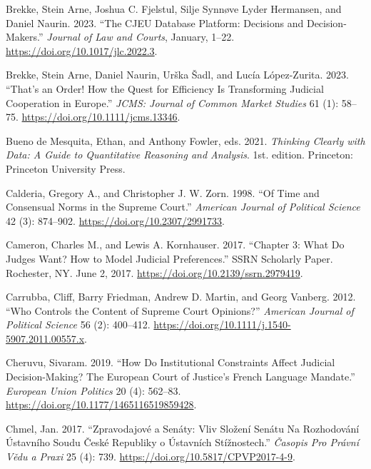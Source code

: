 \documentclass[
  11pt,
]{article}
\newlength{\cslhangindent}
\newenvironment{CSLReferences}[2] %
 {%
  \setlength{\parindent}{0pt}
  \ifodd #1 \everypar{\setlength{\hangindent}{\cslhangindent}}\ignorespaces\fi
  \ifnum #2 > 0
  \setlength{\parskip}{#2\baselineskip}
  \fi
 }%
 {}
\begin{document}
\begin{CSLReferences}{1}{0}
\leavevmode{}%
Brekke, Stein Arne, Joshua C. Fjelstul, Silje Synnøve Lyder Hermansen,
and Daniel Naurin. 2023. {``The {CJEU Database Platform}: {Decisions}
and {Decision-Makers}.''} \emph{Journal of Law and Courts}, January,
1--22. \url{https://doi.org/10.1017/jlc.2022.3}.

\leavevmode{}%
Brekke, Stein Arne, Daniel Naurin, Urška Šadl, and Lucía López-Zurita.
2023. {``That's an {Order}! {How} the {Quest} for {Efficiency Is
Transforming Judicial Cooperation} in {Europe}.''} \emph{JCMS: Journal
of Common Market Studies} 61 (1): 58--75.
\url{https://doi.org/10.1111/jcms.13346}.

\leavevmode{}%
Bueno de Mesquita, Ethan, and Anthony Fowler, eds. 2021. \emph{Thinking
Clearly with Data: A Guide to Quantitative Reasoning and Analysis}. 1st.
edition. {Princeton}: {Princeton University Press}.

\leavevmode{}%
Calderia, Gregory A., and Christopher J. W. Zorn. 1998. {``Of {Time} and
{Consensual Norms} in the {Supreme Court}.''} \emph{American Journal of
Political Science} 42 (3): 874--902.
\url{https://doi.org/10.2307/2991733}.

\leavevmode{}%
Cameron, Charles M., and Lewis A. Kornhauser. 2017. {``Chapter 3: {What
Do Judges Want}? {How} to {Model Judicial Preferences}.''} SSRN
Scholarly Paper. {Rochester, NY}. June 2, 2017.
\url{https://doi.org/10.2139/ssrn.2979419}.

\leavevmode{}%
Carrubba, Cliff, Barry Friedman, Andrew D. Martin, and Georg Vanberg.
2012. {``Who {Controls} the {Content} of {Supreme Court Opinions}?''}
\emph{American Journal of Political Science} 56 (2): 400--412.
\url{https://doi.org/10.1111/j.1540-5907.2011.00557.x}.

\leavevmode{}%
Cheruvu, Sivaram. 2019. {``How Do Institutional Constraints Affect
Judicial Decision-Making? {The European Court} of {Justice}'s {French}
Language Mandate.''} \emph{European Union Politics} 20 (4): 562--83.
\url{https://doi.org/10.1177/1465116519859428}.

\leavevmode{}%
Chmel, Jan. 2017. {``Zpravodajové a Senáty: {Vliv} Složení Senátu Na
Rozhodování {Ústavního} Soudu {České} Republiky o Ústavních
Stížnostech.''} \emph{Časopis Pro Právní Vědu a Praxi} 25 (4): 739.
\url{https://doi.org/10.5817/CPVP2017-4-9}.


\end{CSLReferences}
\end{document}

